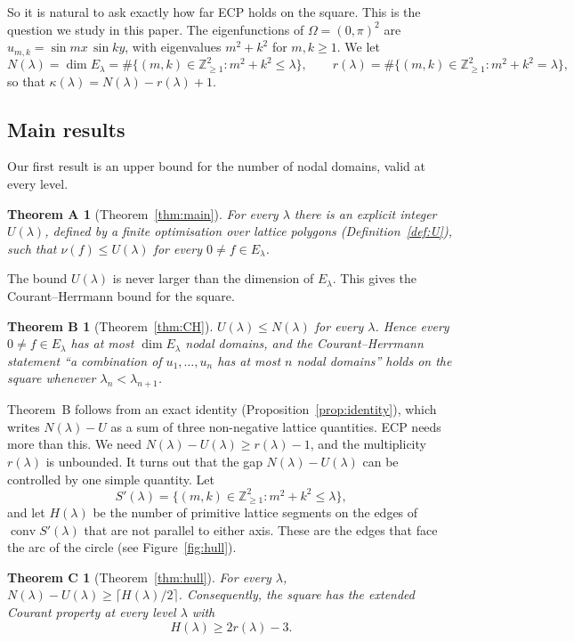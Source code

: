 \documentclass[11pt]{amsart}
\newtheorem*{mainA}{Theorem A}
\newtheorem*{mainB}{Theorem B}
\newtheorem*{mainC}{Theorem C}
\theoremstyle{definition}
\theoremstyle{remark}
\newcommand{\Z}{\mathbb{Z}}
\newcommand{\conv}{\operatorname{conv}}
\numberwithin{equation}{section}
\begin{document}
So it is natural to ask exactly how far ECP holds on the square. This is the question we study
in this paper. The eigenfunctions of $\Omega=(0,\pi)^2$ are $u_{m,k}=\sin mx\,\sin ky$, with
eigenvalues $m^2+k^2$ for $m,k\ge1$. We let
\[
N(\lambda)=\dim E_\lambda=\#\{(m,k)\in\Z_{\ge1}^2:m^2+k^2\le\lambda\},\qquad
r(\lambda)=\#\{(m,k)\in\Z_{\ge1}^2:m^2+k^2=\lambda\},
\]
so that $\kappa(\lambda)=N(\lambda)-r(\lambda)+1$.

\subsection{Main results}

Our first result is an upper bound for the number of nodal domains, valid at every level.

\begin{mainA}[Theorem~\ref{thm:main}]
For every $\lambda$ there is an explicit integer $U(\lambda)$, defined by a finite
optimisation over lattice polygons (Definition~\ref{def:U}), such that
$\nu(f)\le U(\lambda)$ for every $0\ne f\in E_\lambda$.
\end{mainA}

The bound $U(\lambda)$ is never larger than the dimension of $E_\lambda$. This gives the
Courant--Herrmann bound for the square.

\begin{mainB}[Theorem~\ref{thm:CH}]
$U(\lambda)\le N(\lambda)$ for every $\lambda$. Hence every $0\ne f\in E_\lambda$ has at most
$\dim E_\lambda$ nodal domains, and the Courant--Herrmann statement ``a combination of
$u_1,\dots,u_n$ has at most $n$ nodal domains'' holds on the square whenever
$\lambda_n<\lambda_{n+1}$.
\end{mainB}

Theorem~B follows from an exact identity (Proposition~\ref{prop:identity}), which writes
$N(\lambda)-U$ as a sum of three non-negative lattice quantities. ECP needs more than this. We
need $N(\lambda)-U(\lambda)\ge r(\lambda)-1$, and the multiplicity $r(\lambda)$ is unbounded.
It turns out that the gap $N(\lambda)-U(\lambda)$ can be controlled by one simple quantity. Let
\[
S'(\lambda)=\{(m,k)\in\Z_{\ge1}^2: m^2+k^2\le\lambda\},
\]
and let $H(\lambda)$ be the number of primitive lattice segments on the edges of
$\conv S'(\lambda)$ that are not parallel to either axis. These are the edges that face the arc
of the circle (see Figure~\ref{fig:hull}).

\begin{mainC}[Theorem~\ref{thm:hull}]
For every $\lambda$, $N(\lambda)-U(\lambda)\ge\lceil H(\lambda)/2\rceil$. Consequently, the
square has the extended Courant property at every level $\lambda$ with
\[
H(\lambda)\ge2r(\lambda)-3 .
\]
\end{mainC}
\end{document}

